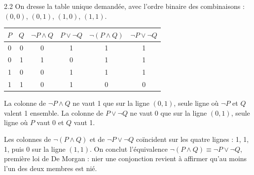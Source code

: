 \begin{corrige}{2.2}
On dresse la table unique demandée, avec l'ordre binaire des combinaisons : $(0, 0)$, $(0, 1)$, $(1, 0)$, $(1, 1)$.

\begin{center}
\begin{tabular}{cc|cccc}
\toprule
\rowcolor{robleuf}$P$ & $Q$ & $\lnot P \land Q$ & $P \lor \lnot Q$ & $\lnot (P \land Q)$ & $\lnot P \lor \lnot Q$ \\
\midrule
0 & 0 & 0 & 1 & 1 & 1 \\
\rowcolor{rogrisf!50}0 & 1 & 1 & 0 & 1 & 1 \\
1 & 0 & 0 & 1 & 1 & 1 \\
\rowcolor{rogrisf!50}1 & 1 & 0 & 1 & 0 & 0 \\
\bottomrule
\end{tabular}
\end{center}

La colonne de $\lnot P \land Q$ ne vaut 1 que sur la ligne $(0, 1)$, seule ligne où $\lnot P$ et $Q$ valent 1 ensemble. La colonne de $P \lor \lnot Q$ ne vaut 0 que sur la ligne $(0, 1)$, seule ligne où $P$ vaut 0 et $Q$ vaut 1.

Les colonnes de $\lnot (P \land Q)$ et de $\lnot P \lor \lnot Q$ coïncident sur les quatre lignes : 1, 1, 1, puis 0 sur la ligne $(1, 1)$. On conclut l'équivalence $\lnot (P \land Q) \equiv \lnot P \lor \lnot Q$, première loi de De Morgan : nier une conjonction revient à affirmer qu'au moins l'un des deux membres est nié.
\end{corrige}

